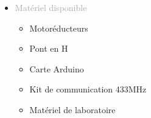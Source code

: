 \documentclass{article}
\begin{document}
\begin{tabular}
\begin{itemize}
\begin{itemize}
        \end{itemize}
        \item \textcolor{darkGray}{Matériel disponible}
        \begin{itemize}
            [label={\textcolor{gray!100}{\checkmark}}, topsep=8pt, partopsep=0pt, itemsep=0.5pt, parsep=2pt,after=\vspace*{-\baselineskip}] 
            \item \textcolor{gray!100}{Motoréducteurs}
            \item \textcolor{gray!100}{Pont en H}
            \item \textcolor{gray!100}{Carte Arduino}
            \item \textcolor{gray!100}{Kit de communication 433MHz}
            \item \textcolor{gray!100}{Matériel de laboratoire}
        \end{itemize}
    \end{itemize}
\end{tabular}

\vfill %
\end{document}
